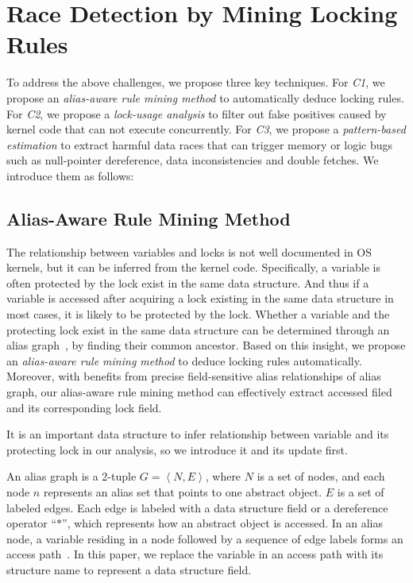 \section{Race Detection by Mining Locking Rules}
\label{sec_technique}
To address the above challenges, we propose three key techniques. For {\em C1}, 
we propose an {\em alias-aware rule mining method} to automatically deduce 
locking rules. For {\em C2}, we propose a {\em lock-usage analysis} to filter 
out false positives caused by kernel code that can not execute concurrently. 
For {\em C3}, we propose a {\em pattern-based estimation} to extract harmful 
data races that can trigger memory or logic bugs such as null-pointer 
dereference, data inconsistencies and double fetches. We introduce them as 
follows:

\subsection{Alias-Aware Rule Mining Method}
\label{subsec_rule_mining}
The relationship between variables and locks is not well documented in OS 
kernels, but it can be inferred from the kernel code. Specifically, a variable 
is often protected by the lock exist in the same data structure. And thus if a 
variable is accessed after acquiring a lock existing in the same data structure 
in most cases, it is likely to be protected by the lock. Whether a variable and 
the protecting lock exist in the same data structure can be determined through 
an alias graph~\cite{Li:ASPLOS22, Kastrinis:CC18}, by finding their common 
ancestor. Based on this insight, we propose an {\em alias-aware rule mining 
method} to deduce locking rules automatically. Moreover, with benefits from 
precise field-sensitive alias relationships of alias graph, our alias-aware 
rule mining method can effectively extract accessed filed and its corresponding 
lock field.

 It is an important data structure to infer relationship 
between variable and its protecting lock in our analysis, so we introduce it 
and its update first. 

An alias graph is a 2-tuple $\mathit{G = \left<N, E\right>}$, where 
$\mathit{N}$ is a set of nodes, and each node $\mathit{n}$ represents an alias 
set that points to one abstract object. $\mathit{E}$ is a set of labeled edges. 
Each edge is labeled with a data structure field or a dereference operator 
``$\mathit{*}$'', which represents how an abstract object is accessed. In an 
alias node, a variable residing in a node followed by a sequence of edge
labels forms an access path~\cite{Kastrinis:CC18, Cheng:PLDI00}. In this paper, 
we replace the variable in an access path with its structure name to represent 
a data structure field.

